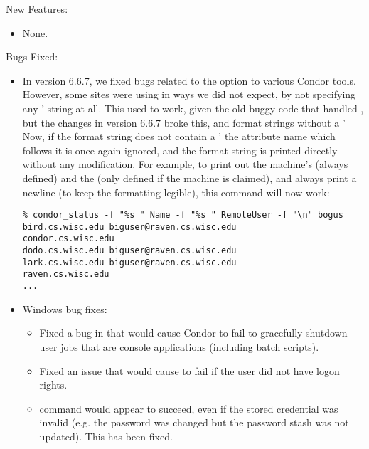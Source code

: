 \noindent New Features:

\begin{itemize}

\item None.

\end{itemize}

\noindent Bugs Fixed:

\begin{itemize}

\item In version 6.6.7, we fixed bugs related to the
   option to various Condor tools.
  However, some sites were using  in ways we did not
  expect, by not specifying any '%
  string at all.
  This used to work, given the old buggy code that handled
  , but the changes in version 6.6.7 broke this, and
  format strings without a '%
  Now, if the format string does not contain a '%
  the attribute name which follows it is once again ignored, and the
  format string is printed directly without any modification.
  For example, to print out the machine's  (always defined)
  and the  (only defined if the machine is claimed),
  and always print a newline (to keep the formatting legible), this
  command will now work:
\begin{verbatim}
% condor_status -f "%s " Name -f "%s " RemoteUser -f "\n" bogus
bird.cs.wisc.edu biguser@raven.cs.wisc.edu
condor.cs.wisc.edu
dodo.cs.wisc.edu biguser@raven.cs.wisc.edu
lark.cs.wisc.edu biguser@raven.cs.wisc.edu
raven.cs.wisc.edu
...
\end{verbatim}

\item Windows bug fixes:
\begin{itemize}

\item Fixed a bug in that would cause Condor to fail to gracefully
shutdown user jobs that are console applications (including batch
scripts).

\item Fixed an issue that would cause  to fail
if the user did not have \verb@NETWORK@ logon rights.

\item {}  command would appear to succeed,
even if the stored credential was invalid (e.g. the password was changed
but the password stash was not updated). This has been fixed.



\end{itemize}
\end{itemize}

